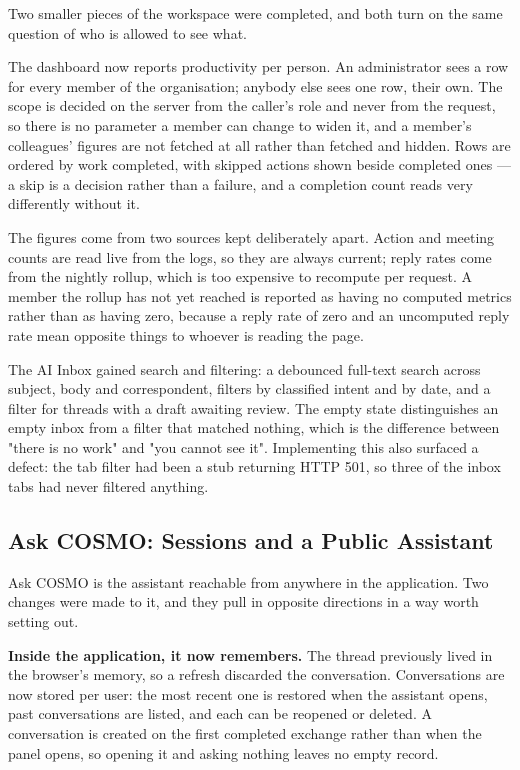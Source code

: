\documentclass[a4paper]{article}
\begin{document}
Two smaller pieces of the workspace were completed, and both turn on the same
question of who is allowed to see what.

The dashboard now reports productivity per person. An administrator sees a row
for every member of the organisation; anybody else sees one row, their own. The
scope is decided on the server from the caller's role and never from the
request, so there is no parameter a member can change to widen it, and a
member's colleagues' figures are not fetched at all rather than fetched and
hidden. Rows are ordered by work completed, with skipped actions shown beside
completed ones --- a skip is a decision rather than a failure, and a completion
count reads very differently without it.

The figures come from two sources kept deliberately apart. Action and meeting
counts are read live from the logs, so they are always current; reply rates come
from the nightly rollup, which is too expensive to recompute per request. A
member the rollup has not yet reached is reported as having no computed metrics
rather than as having zero, because a reply rate of zero and an uncomputed
reply rate mean opposite things to whoever is reading the page.

The AI Inbox gained search and filtering: a debounced full-text search across
subject, body and correspondent, filters by classified intent and by date, and
a filter for threads with a draft awaiting review. The empty state distinguishes
an empty inbox from a filter that matched nothing, which is the difference
between "there is no work" and "you cannot see it". Implementing this also
surfaced a defect: the tab filter had been a stub returning HTTP 501, so three
of the inbox tabs had never filtered anything.

\subsection{Ask COSMO: Sessions and a Public Assistant}
\label{sec:ask-cosmo}

Ask COSMO is the assistant reachable from anywhere in the application. Two
changes were made to it, and they pull in opposite directions in a way worth
setting out.

\textbf{Inside the application, it now remembers.} The thread previously lived
in the browser's memory, so a refresh discarded the conversation. Conversations
are now stored per user: the most recent one is restored when the assistant
opens, past conversations are listed, and each can be reopened or deleted. A
conversation is created on the first completed exchange rather than when the
panel opens, so opening it and asking nothing leaves no empty record.
\end{document}
